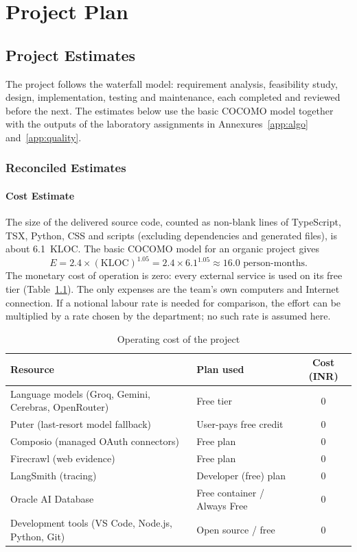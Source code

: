\chapter{Project Plan}

\section{Project Estimates}
The project follows the waterfall model: requirement analysis, feasibility study, design, implementation, testing and maintenance, each completed and reviewed before the next. The estimates below use the basic COCOMO model together with the outputs of the laboratory assignments in Annexures~\ref{app:algo} and~\ref{app:quality}.
\subsection{Reconciled Estimates}
\subsubsection{Cost Estimate}
The size of the delivered source code, counted as non-blank lines of TypeScript, TSX, Python, CSS and scripts (excluding dependencies and generated files), is about 6.1~KLOC. The basic COCOMO model for an organic project gives
\[ E = 2.4 \times (\mathrm{KLOC})^{1.05} = 2.4 \times 6.1^{1.05} \approx 16.0 \mbox{ person-months}. \]
The monetary cost of operation is zero: every external service is used on its free tier (Table~\ref{tab:cost}). The only expenses are the team's own computers and Internet connection. If a notional labour rate is needed for comparison, the effort can be multiplied by a rate chosen by the department; no such rate is assumed here.

\begin{table}[!htbp]
\begin{center}
\def\arraystretch{1.3}
\begin{tabular}{| l | l | c |}
\hline
Resource & Plan used & Cost (INR) \\ \hline
Language models (Groq, Gemini, Cerebras, OpenRouter) & Free tier & 0 \\ \hline
Puter (last-resort model fallback) & User-pays free credit & 0 \\ \hline
Composio (managed OAuth connectors) & Free plan & 0 \\ \hline
Firecrawl (web evidence) & Free plan & 0 \\ \hline
LangSmith (tracing) & Developer (free) plan & 0 \\ \hline
Oracle AI Database & Free container / Always Free & 0 \\ \hline
Development tools (VS Code, Node.js, Python, Git) & Open source / free & 0 \\ \hline
\end{tabular}
\end{center}
\caption{Operating cost of the project}
\label{tab:cost}
\end{table}

